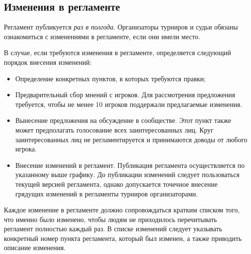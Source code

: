 \subsection{Изменения в регламенте}

Регламент публикуется \textit{раз в полгода}. Организаторы турниров и судьи обязаны ознакомиться с изменениями в регламенте, если они имели место.

В случае, если требуются изменения в регламенте, определяется следующий порядок внесения изменений:
\begin{itemize}
	\item Определение конкретных пунктов, в которых требуются правки;
	\item Предварительный сбор мнений с игроков. Для рассмотрения предложения требуется, чтобы не менее 10 игроков поддержали предлагаемые изменения.
	\item Вынесение предложения на обсуждение в сообществе. Этот пункт также может предполагать голосование всех заинтересованных лиц. Круг заинтересованных лиц не регламентируется и принимаются доводы от любого игрока.
	\item Внесение изменений в регламент. Публикация регламента осуществляется по указанному выше графику. До публикации изменений следует пользоваться текущей версией регламента, однако допускается точечное внесение грядущих изменений в регламенты турниров организаторами.
\end{itemize}

Каждое изменение в регламенте должно сопровождаться кратким списком того, что именно было изменено, чтобы людям не приходилось перечитывать регламент полностью каждый раз. В списке изменений следует указывать конкретный номер пункта регламента, который был изменен, а также приводить описание изменения.
